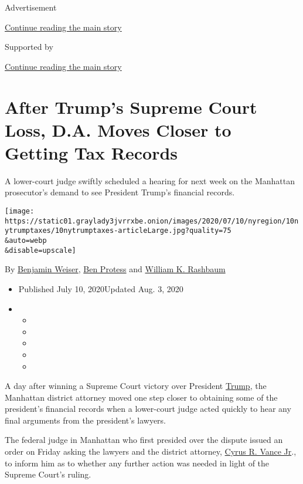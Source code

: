 Advertisement

\protect\hyperlink{after-top}{Continue reading the main story}

Supported by

\protect\hyperlink{after-sponsor}{Continue reading the main story}

\hypertarget{after-trumps-supreme-court-loss-da-moves-closer-to-getting-tax-records}{%
\section{After Trump's Supreme Court Loss, D.A. Moves Closer to Getting
Tax
Records}\label{after-trumps-supreme-court-loss-da-moves-closer-to-getting-tax-records}}

A lower-court judge swiftly scheduled a hearing for next week on the
Manhattan prosecutor's demand to see President Trump's financial
records.

\texttt{[image: https://static01.graylady3jvrrxbe.onion/images/2020/07/10/nyregion/10nytrumptaxes/10nytrumptaxes-articleLarge.jpg?quality=75\\\&auto=webp\\\&disable=upscale]}

By \href{https://www.nytimes3xbfgragh.onion/by/benjamin-weiser}{Benjamin
Weiser}, \href{https://www.nytimes3xbfgragh.onion/by/ben-protess}{Ben
Protess} and
\href{https://www.nytimes3xbfgragh.onion/by/william-k-rashbaum}{William
K. Rashbaum}

\begin{itemize}
\item
  Published July 10, 2020Updated Aug. 3, 2020
\item
  \begin{itemize}
  \item
  \item
  \item
  \item
  \item
  \end{itemize}
\end{itemize}

A day after winning a Supreme Court victory over President
\href{https://www.nytimes3xbfgragh.onion/2020/07/13/nyregion/cy-vance-manhattan-da-trump.html}{Trump},
the Manhattan district attorney moved one step closer to obtaining some
of the president's financial records when a lower-court judge acted
quickly to hear any final arguments from the president's lawyers.

The federal judge in Manhattan who first presided over the dispute
issued an order on Friday asking the lawyers and the district attorney,
\href{https://www.nytimes3xbfgragh.onion/2020/07/13/nyregion/cy-vance-manhattan-da-trump.html}{Cyrus
R. Vance Jr}., to inform him as to whether any further action was needed
in light of the Supreme Court's ruling.

